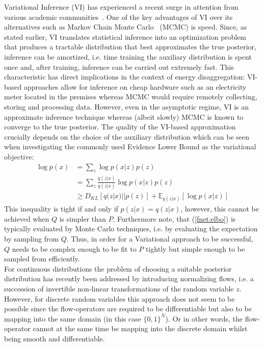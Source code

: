 Variational Inference (VI) has experienced a recent surge in attention from various academic communities~\cite{hoffman2013stochastic,kingma2013auto}. One of the key advantages of VI over its alternatives such as Markov Chain Monte Carlo~\cite{geman1984stochastic} (MCMC) is speed. Since, as stated earlier, VI translates statistical inference into an optimization problem that produces a tractable distribution that best approximates the true posterior, inference can be amortized, i.e. time training the auxiliary distribution is spent once and, after training, inference can be carried out extremely fast. This characteristic has direct implications in the context of energy disaggregation: VI-based approaches allow for inference on cheap hardware such as an electricity meter located in the premises whereas MCMC would require remotely collecting, storing and processing data. However, even in the asymptotic regime, VI is an approximate inference technique whereas (albeit slowly) MCMC is known to converge to the true posterior. The quality of the VI-based approximation crucially depends on the choice of the auxiliary distribution which can be seen when investigating the commonly used Evidence Lower Bound as the variational objective:
\begin{align}
\log p(x) &= \sum_z \log p(x|z) p(z)\\
              &= \sum_z \frac{q(z|x)}{q(z|x)} \log p(x|z) p(z)\\
              &\geq D_{KL} [q(z|x) || p(z)] + \mathbb{E}_{q(z|x)} [\log p(x|z)] \label{fnet:elbo}
\end{align}
This inequality is tight if and only if $p(z|x) = q(z|x)$, however, this cannot be achieved when $Q$ is simpler than $P$. Furthermore note, that (\ref{fnet:elbo}) is typically evaluated by Monte Carlo techniques, i.e. by evaluating the expectation by sampling from $Q$. Thus, in order for a Variational approach to be successful, $Q$ needs to be complex enough to be fit to $P$ tightly but simple enough to be sampled from efficiently.\\
For continuous distributions the problem of choosing a suitable posterior distribution has recently been addressed by introducing normalizing flows\cite{rezende2015variational}, i.e. a succession of invertible non-linear transformations of the random variable $z$. However, for discrete random variables this approach does not seem to be possible since the flow-operators are required to be differentiable but also to be mapping into the same domain (in this case $\{0,1\}^N$). Or in other words, the flow-operator cannot at the same time be mapping into the discrete domain whilst being smooth and differentiable.\\
